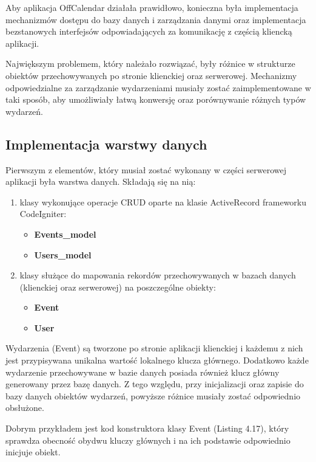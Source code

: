 Aby aplikacja OffCalendar działała prawidłowo, konieczna była implementacja mechanizmów dostępu do bazy danych i zarządzania danymi oraz implementacja bezstanowych interfejsów odpowiadających za komunikację z częścią kliencką aplikacji.

Największym problemem, który należało rozwiązać, były różnice w strukturze obiektów przechowywanych po stronie klienckiej oraz serwerowej. Mechanizmy odpowiedzialne za zarządzanie wydarzeniami musiały zostać zaimplementowane w taki sposób, aby umożliwiały łatwą konwersję oraz porównywanie różnych typów wydarzeń.

\subsection{Implementacja warstwy danych}
\label{komBazaDanych}

Pierwszym z elementów, który musiał zostać wykonany w części serwerowej aplikacji była warstwa danych. Składają się na nią: 

\begin{enumerate}
\item klasy wykonujące operacje CRUD oparte na klasie ActiveRecord\cite{ciActiveRecord} frameworku CodeIgniter:
\begin{itemize}
\item \textbf{Events\_model}
\item \textbf{Users\_model}
\end{itemize}
\item klasy służące do mapowania rekordów przechowywanych w bazach danych (klienckiej oraz serwerowej) na poszczególne obiekty:
\begin{itemize}
\item \textbf{Event}
\item \textbf{User}
\end{itemize}
\end{enumerate}

Wydarzenia (Event) są tworzone po stronie aplikacji klienckiej i każdemu z nich jest przypisywana unikalna wartość lokalnego klucza głównego. Dodatkowo każde wydarzenie przechowywane w bazie danych posiada również klucz główny generowany przez bazę danych. Z tego względu, przy inicjalizacji oraz zapisie do bazy danych obiektów wydarzeń, powyższe różnice musiały zostać odpowiednio obsłużone.

Dobrym przykładem jest kod konstruktora klasy Event (Listing 4.17), który sprawdza obecność obydwu kluczy głównych i na ich podstawie odpowiednio inicjuje obiekt.

